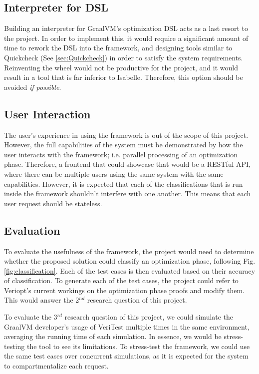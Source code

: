 \subsection{Interpreter for DSL}
\label{sec:DSLInterpreter}

Building an interpreter for GraalVM's optimization DSL acts as a last resort to the project. In order to implement this, it would require a significant 
amount of time to rework the DSL into the framework, and designing tools similar to Quickcheck (See \ref{sec:Quickcheck}) in order to satisfy the 
system requirements. Reinventing the wheel would not be productive for the project, and it would result in a tool that is far inferior to Isabelle.
Therefore, this option should be avoided \emph{if possible}.

\pagebreak

\subsection{User Interaction}

The user's experience in using the framework is out of the scope of this project. However, the full capabilities of the system must be demonstrated 
by how the user interacts with the framework; i.e. parallel processing of an optimization phase. Therefore, a frontend that could showcase that would 
be a RESTful API, where there can be multiple users using the same system with the same capabilities. However, it is expected that each of the 
classifications that is run inside the framework shouldn't interfere with one another. This means that each user request should be stateless.

\subsection{Evaluation}
\label{sec:Evaluation}

To evaluate the usefulness of the framework, the project would need to determine whether the proposed solution could classify an optimization phase, 
following Fig. \ref{fig:classification}. Each of the test cases is then evaluated based on their accuracy of classification. To generate each of the 
test cases, the project could refer to Veriopt's current workings on the optimization phase proofs and modify them. This would answer the 2\(^{nd}\) 
research question of this project.

To evaluate the 3\(^{rd}\) research question of this project, we could simulate the GraalVM developer's usage of VeriTest multiple times in 
the same environment, averaging the running time of each simulation. In essence, we would be stress-testing the tool to see its limitations.
To stress-test the framework, we could use the same test cases over concurrent simulations, as it is expected for the system to compartmentalize 
each request.